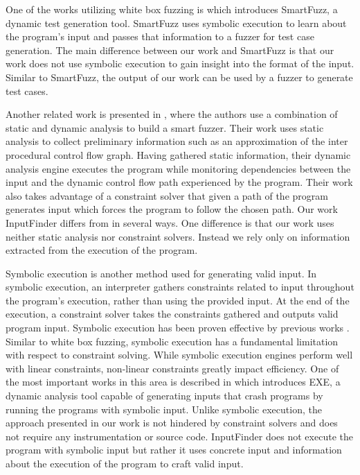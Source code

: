 \documentclass{acm_proc_article-sp}
\def \tool {InputFinder}
\begin{document}
One of the works utilizing white box fuzzing is \cite{molnar2009dynamic} which introduces SmartFuzz, a dynamic test generation tool.
SmartFuzz uses symbolic execution to learn about the program's input and passes that information to a fuzzer for test case generation.
The main difference between our work and SmartFuzz is that our work does not use symbolic execution to gain insight into the format of the input.
Similar to SmartFuzz, the output of our work can be used by a fuzzer to generate test cases.

Another related work is presented in \cite{smartfuzzer}, where the authors use a combination of static and dynamic analysis to build a smart fuzzer.
Their work uses static analysis to collect preliminary information such as an approximation of the inter procedural control flow graph.
Having gathered static information, their dynamic analysis engine executes the program while monitoring dependencies between the input and the dynamic control flow path experienced by the program.
Their work also takes advantage of a constraint solver that given a path of the program generates input which forces the program to follow the chosen path.
Our work \tool{} differs from \cite{smartfuzzer} in several ways.
One difference is that our work uses neither static analysis nor constraint solvers.
Instead we rely only on information extracted from the execution of the program. 

Symbolic execution is another method used for generating valid input.
In symbolic execution, an interpreter gathers constraints related to input throughout the program's execution, rather than using the provided input.
At the end of the execution, a constraint solver takes the constraints gathered and outputs valid program input.
Symbolic execution has been proven effective by previous works \cite{symbolicexecution, exesymex}.
Similar to white box fuzzing, symbolic execution has a fundamental limitation with respect to constraint solving.
While symbolic execution engines perform well with linear constraints, non-linear constraints greatly impact efficiency.
One of the most important works in this area is described in \cite{exesymex} which introduces EXE, a dynamic analysis tool capable of generating inputs that crash programs by running the programs with symbolic input.
Unlike symbolic execution, the approach presented in our work is not hindered by constraint solvers and does not require any instrumentation or source code.
\tool{} does not execute the program with symbolic input but rather it uses concrete input and information about the execution of the program to craft valid input.
\end{document}
